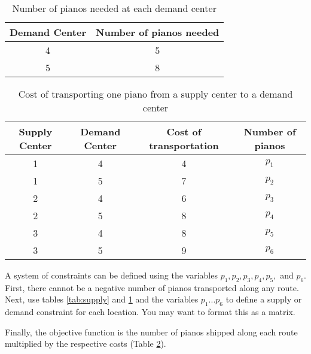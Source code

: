 \begin{table}[H]
\centering
\begin{tabular}{|c|c|}
Demand Center & Number of pianos needed\\
\hline
4 & 5\\
5 & 8\\
\end{tabular}

\caption{Number of pianos needed at each demand center}
\label{tab:demand}
\end{table}

\begin{table}[H]
\centering
\begin{tabular}{|c|c|c|c|}
Supply Center & Demand Center & Cost of transportation & Number of pianos\\
\hline
1 & 4 & 4 & $p_1$\\
1 & 5 & 7 & $p_2$\\
2 & 4 & 6 & $p_3$\\
2 & 5 & 8 & $p_4$\\
3 & 4 & 8 & $p_5$\\
3 & 5 & 9 & $p_6$\\
\end{tabular}
\caption{Cost of transporting one piano from a supply center to a demand center}
\label{tab:cost}
\end{table}

A system of constraints can be defined using the variables $p_1,p_2,p_3,p_4,p_5,$ and $p_6$.
First, there cannot be a negative number of pianos transported along any route.
Next, use tables \ref{tab:supply} and \ref{tab:demand} and the variables $p_1...p_6$ to define a supply or demand constraint for each location.
You may want to format this as a matrix.
\begin{comment} %
the following three supply constraints and two demand constraints:
\begin{align*}
p_1 + p_2  &= 7\\
p_3 + p_4  &= 2\\
p_5 + p_6  &= 4\\
p_1 + p_3 + p_5 &= 5\\
p_2 + p_4 + p_6 &= 8
\end{align*}
\end{comment}
Finally, the objective function is the number of pianos shipped along each route multiplied by the respective costs (Table \ref{tab:cost}).

